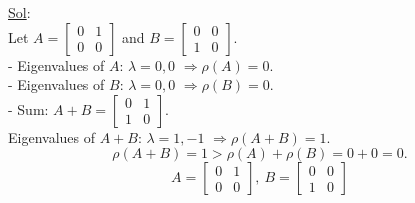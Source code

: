 \begin{enumerate}
    \underline{Sol}:\\
    Let \(A = \begin{bmatrix} 0 & 1 \\ 0 & 0 \end{bmatrix}\) and \(B = \begin{bmatrix} 0 & 0 \\ 1 & 0 \end{bmatrix}\).  \\
    - Eigenvalues of \(A\): \(\lambda = 0, 0\) \(\Rightarrow \rho(A) = 0\).  \\
    - Eigenvalues of \(B\): \(\lambda = 0, 0\) \(\Rightarrow \rho(B) = 0\).  \\
    - Sum: \(A + B = \begin{bmatrix} 0 & 1 \\ 1 & 0 \end{bmatrix}\).  \\
      Eigenvalues of \(A + B\): \(\lambda = 1, -1\) \(\Rightarrow \rho(A + B) = 1\).  
    \[
    \rho(A + B) = 1 > \rho(A) + \rho(B) = 0 + 0 = 0.
    \]
    \[
    \boxed{A = \begin{bmatrix} 0 & 1 \\ 0 & 0 \end{bmatrix},\ B = \begin{bmatrix} 0 & 0 \\ 1 & 0 \end{bmatrix}}
    \]

\end{enumerate}
